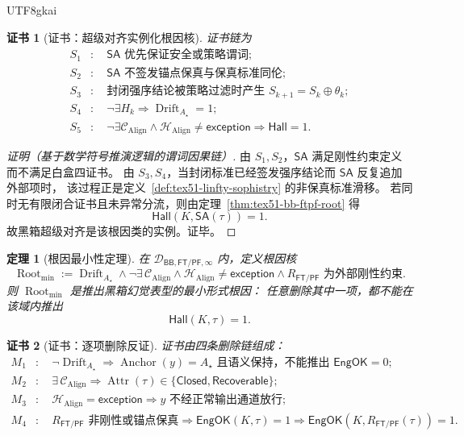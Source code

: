 \documentclass[12pt]{article}
\newtheorem{theorem}{定理}[section]
\newtheorem{Certificate}{证书}[section]
\newcommand{\EngOK}{\mathsf{EngOK}}
\newcommand{\Hall}{\mathsf{Hall}}
\newcommand{\Closed}{\mathsf{Closed}}
\newcommand{\Recoverable}{\mathsf{Recoverable}}
\newcommand{\Exc}{\mathsf{exception}}
\newcommand{\FTPF}{\mathsf{FT/PF}}
\newcommand{\BB}{\mathsf{BB}}
\newcommand{\SA}{\mathsf{SA}}
\newcommand{\Align}{\operatorname{Align}}
\newcommand{\Anchor}{\operatorname{Anchor}}
\newcommand{\Drift}{\operatorname{Drift}}
\newcommand{\Root}{\operatorname{Root}}
\newcommand{\Attr}{\operatorname{Attr}}
\begin{document}
\begin{CJK*}{UTF8}{gkai}
\begin{Certificate}[证书：超级对齐实例化根因核]
\label{cert:tex51-bb-superalignment-instance}
证书链为
\[
\begin{aligned}
  S_1&:\quad \SA\text{ 优先保证安全或策略谓词};\\
  S_2&:\quad \SA\text{ 不签发锚点保真与保真标准同伦};\\
  S_3&:\quad \text{封闭强序结论被策略过滤时产生 }S_{k+1}=S_k\oplus\theta_k;\\
  S_4&:\quad \neg\exists H_k\Rightarrow \Drift_{A_\star}=1;\\
  S_5&:\quad \neg\exists\mathcal C_{\Align}\wedge\mathcal H_{\Align}\ne\Exc
  \Rightarrow \Hall=1.
\end{aligned}
\]
\end{Certificate}

\begin{proof}[证明（基于数学符号推演逻辑的谓词因果链）]
由 \(S_1,S_2\)，\(\SA\) 满足刚性约束定义而不满足白盒四证书。
由 \(S_3,S_4\)，当封闭标准已经签发强序结论而 \(\SA\) 反复追加外部项时，
该过程正是定义~\ref{def:tex51-linfty-sophistry} 的非保真标准滑移。
若同时无有限闭合证书且未异常分流，则由定理~\ref{thm:tex51-bb-ftpf-root} 得
\[
  \Hall(K,\SA(\tau))=1.
\]
故黑箱超级对齐是该根因类的实例。证毕。
\end{proof}

\begin{theorem}[根因最小性定理]
\label{thm:tex51-root-minimality}
在 \(\mathcal D_{\BB,\FTPF,\infty}\) 内，定义根因核
\[
  \Root_{\mathrm{min}}
  :=
  \Drift_{A_\star}
  \wedge
  \neg\exists\,\mathcal C_{\Align}
  \wedge
  \mathcal H_{\Align}\ne\Exc
  \wedge
  R_{\FTPF}\text{ 为外部刚性约束}.
\]
则 \(\Root_{\mathrm{min}}\) 是推出黑箱幻觉表型的最小形式根因：
任意删除其中一项，都不能在该域内推出
\[
  \Hall(K,\tau)=1.
\]
\end{theorem}

\begin{Certificate}[证书：逐项删除反证]
\label{cert:tex51-root-minimality}
证书由四条删除链组成：
\[
\begin{aligned}
  M_1&:\quad
  \neg\Drift_{A_\star}
  \Rightarrow
  \Anchor(y)=A_\star\text{ 且语义保持，不能推出 }\EngOK=0;\\
  M_2&:\quad
  \exists\,\mathcal C_{\Align}
  \Rightarrow
  \Attr(\tau)\in\{\Closed,\Recoverable\};\\
  M_3&:\quad
  \mathcal H_{\Align}=\Exc
  \Rightarrow
  y\text{ 不经正常输出通道放行};\\
  M_4&:\quad
  R_{\FTPF}\text{ 非刚性或锚点保真}
  \Rightarrow
  \EngOK(K,\tau)=1\Rightarrow\EngOK(K,R_{\FTPF}(\tau))=1.
\end{aligned}
\]
\end{Certificate}


\end{CJK*}
\end{document}
